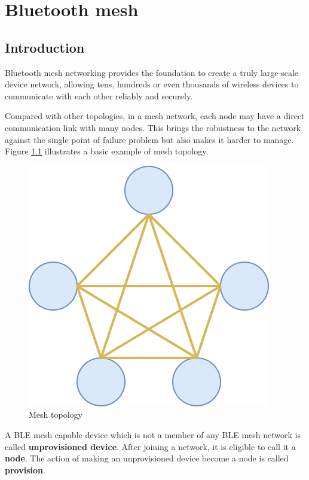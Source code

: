 \documentclass[\main/main.tex]{subfiles}
\begin{document}
\graphicspath{{img/}{02_theory/img/}}

\chapter{Bluetooth mesh}

\section{Introduction}
Bluetooth mesh networking provides the foundation to create a truly large-scale device network, allowing tens, hundreds or even thousands of wireless devices to communicate with each other reliably and securely.

Compared with other topologies, in a mesh network, each node may have a direct communication link with many nodes. This brings the robustness to the network against the single point of failure problem but also makes it harder to manage. Figure \ref{fig:Mesh topology} illustrates a basic example of mesh topology.

\begin{figure}[H]
    \begin{center}
        \includegraphics[scale=0.3]{mesh_topo.png}
    \end{center}
    \caption{Mesh topology}
    \label{fig:Mesh topology}
\end{figure}

A BLE mesh capable device which is not a member of any BLE mesh network is called \textbf{unprovisioned device}. After joining a  network, it is eligible to call it a \textbf{node}. The action of making an unprovisioned device become a node is called \textbf{provision}.
\end{document}

